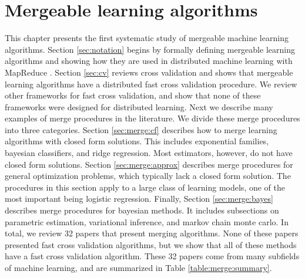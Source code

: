 \documentclass[thesis.tex]{subfiles}
\begin{document}
\chapter{Mergeable learning algorithms}
\label{chapter:merge}

\noindent
This chapter presents the first systematic study of mergeable machine learning algorithms.
Section \ref{sec:notation} begins by formally defining mergeable learning algorithms 
and showing how they are used in distributed machine learning with MapReduce \citep{dean2008mapreduce}.
Section \ref{sec:cv} reviews cross validation and shows that mergeable learning algorithms have a distributed fast cross validation procedure. 
We review other frameworks for fast cross validation,
and show that none of these frameworks were designed for distributed learning.
Next we describe many examples of merge procedures in the literature.
We divide these merge procedures into three categories.
Section \ref{sec:merge:cf} describes how to merge learning algorithms with closed form solutions.
This includes exponential families, bayesian classifiers, and ridge regression.
Most estimators, however, do not have closed form solutions.
Section \ref{sec:merge:approx} describes merge procedures for general optimization problems,
which typically lack a closed form solution.
The procedures in this section apply to a large class of learning models,
one of the most important being logistic regression.
Finally, Section \ref{sec:merge:bayes} describes merge procedures for bayesian methods.
It includes subsections on parametric estimation, variational inference, and markov chain monte carlo.
In total, we review 32 papers that present merging algorithms.
None of these papers presented fast cross validation algorithms,
but we show that all of these methods have a fast cross validation algorithm.
These 32 papers come from many subfields of machine learning,
and are summarized in Table \ref{table:merge:summary}.
\end{document}
